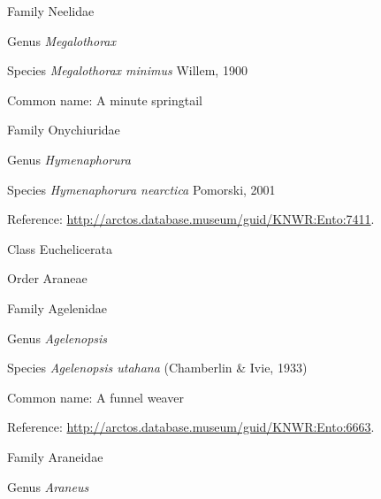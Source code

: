 \documentclass[9pt, article]{memoir}
\begin{document}
\begin{multicols}{2}
\vspace{6pt}\noindent\hspace{24pt}Family Neelidae


\vspace{6pt}\noindent\hspace{30pt}Genus \textit{Megalothorax}


\vspace{6pt}\noindent\hspace{36pt}Species \textit{Megalothorax minimus} Willem, 1900


Common name: A minute springtail

\vspace{6pt}\noindent\hspace{24pt}Family Onychiuridae


\vspace{6pt}\noindent\hspace{30pt}Genus \textit{Hymenaphorura}


\vspace{6pt}\noindent\hspace{36pt}Species \textit{Hymenaphorura nearctica} Pomorski, 2001


Reference: 
\url{http://arctos.database.museum/guid/KNWR:Ento:7411}.

\vspace{6pt}\noindent\hspace{12pt}Class Euchelicerata


\vspace{6pt}\noindent\hspace{18pt}Order Araneae


\vspace{6pt}\noindent\hspace{24pt}Family Agelenidae


\vspace{6pt}\noindent\hspace{30pt}Genus \textit{Agelenopsis}


\vspace{6pt}\noindent\hspace{36pt}Species \textit{Agelenopsis utahana} (Chamberlin \& Ivie, 1933)


Common name: A funnel weaver

Reference: 
\url{http://arctos.database.museum/guid/KNWR:Ento:6663}.

\vspace{6pt}\noindent\hspace{24pt}Family Araneidae


\vspace{6pt}\noindent\hspace{30pt}Genus \textit{Araneus}



\end{multicols}
\end{document}
